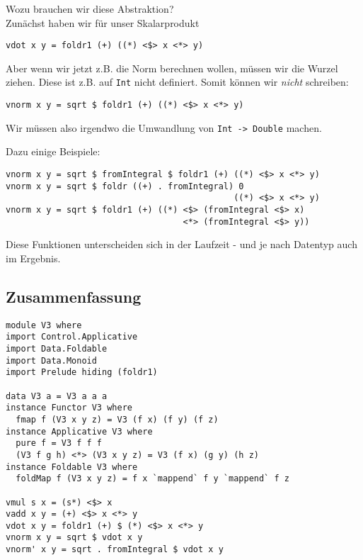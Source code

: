 \documentclass{beamer}
\begin{document}
\begin{frame}[fragile]
Wozu brauchen wir diese Abstraktion?\\\pause
Zunächst haben wir für unser Skalarprodukt
\begin{verbatim}
vdot x y = foldr1 (+) ((*) <$> x <*> y)
\end{verbatim}
\pause
Aber wenn wir jetzt z.B. die Norm berechnen wollen, müssen wir die Wurzel ziehen. \pause Diese ist z.B. auf \texttt{Int} nicht definiert. \pause Somit können wir \emph{nicht} schreiben:
\begin{verbatim}
vnorm x y = sqrt $ foldr1 (+) ((*) <$> x <*> y)
\end{verbatim}
\pause
Wir müssen also irgendwo die Umwandlung von \texttt{Int -> Double} machen. \\\par 
\pause
Dazu einige Beispiele:
\begin{verbatim}
vnorm x y = sqrt $ fromIntegral $ foldr1 (+) ((*) <$> x <*> y)
vnorm x y = sqrt $ foldr ((+) . fromIntegral) 0
                                             ((*) <$> x <*> y)
vnorm x y = sqrt $ foldr1 (+) ((*) <$> (fromIntegral <$> x)
                                   <*> (fromIntegral <$> y))
\end{verbatim}
\pause
Diese Funktionen unterscheiden sich in der Laufzeit - und je nach Datentyp auch im Ergebnis.
\end{frame}

\subsection{Zusammenfassung}
\begin{frame}[fragile]
\begin{verbatim}
module V3 where
import Control.Applicative
import Data.Foldable
import Data.Monoid
import Prelude hiding (foldr1)

data V3 a = V3 a a a
instance Functor V3 where
  fmap f (V3 x y z) = V3 (f x) (f y) (f z)
instance Applicative V3 where
  pure f = V3 f f f
  (V3 f g h) <*> (V3 x y z) = V3 (f x) (g y) (h z)
instance Foldable V3 where
  foldMap f (V3 x y z) = f x `mappend` f y `mappend` f z

vmul s x = (s*) <$> x
vadd x y = (+) <$> x <*> y
vdot x y = foldr1 (+) $ (*) <$> x <*> y
vnorm x y = sqrt $ vdot x y
vnorm' x y = sqrt . fromIntegral $ vdot x y
\end{verbatim}
\end{frame}
\end{document}
